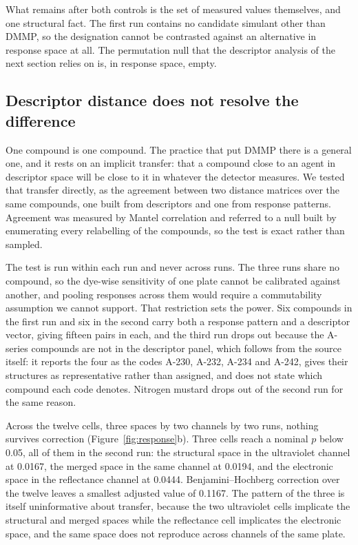 \documentclass[journal=jacsat,manuscript=article,margin=1in]{achemso}
\begin{document}
What remains after both controls is the set of measured values themselves,
and one structural fact. The first run contains no candidate simulant other
than DMMP, so the designation cannot be contrasted against an alternative
in response space at all. The permutation null that the descriptor analysis
of the next section relies on is, in response space, empty.

\subsection{Descriptor distance does not resolve the difference}
\label{res:mantel}

One compound is one compound. The practice that put DMMP there is a general
one, and it rests on an implicit transfer: that a compound close to an agent
in descriptor space will be close to it in whatever the detector measures. We
tested that transfer directly, as the agreement between two distance matrices
over the same compounds, one built from descriptors and one from response
patterns. Agreement was measured by Mantel correlation
and referred to a null built by enumerating every relabelling of the
compounds, so the test is exact rather than sampled.

The test is run within each run and never across runs. The three runs share
no compound, so the dye-wise sensitivity of one plate cannot be calibrated
against another, and pooling responses across them would require a
commutability assumption we cannot support. That restriction sets the
power. Six compounds in the first run and six in the second carry both a
response pattern and a descriptor vector, giving fifteen pairs in each,
and the third run drops out because the A-series compounds are not in the
descriptor panel, which follows from the source itself: it reports the four
as the codes A-230, A-232, A-234 and A-242, gives their structures as
representative rather than assigned, and does not state which compound each
code denotes\cite{group3ref}. Nitrogen mustard drops out of the second run for the same
reason.

Across the twelve cells, three spaces by two channels by two runs, nothing
survives correction (Figure~\ref{fig:response}b). Three cells reach a
nominal $p$ below 0.05, all of them in the second run: the structural space
in the ultraviolet channel at 0.0167, the merged space in the same channel
at 0.0194, and the electronic space in the reflectance channel at 0.0444.
Benjamini--Hochberg correction over the twelve leaves a smallest adjusted
value of 0.1167. The pattern of the three is itself uninformative about
transfer, because the two ultraviolet cells implicate the structural and
merged spaces while the reflectance cell implicates the electronic space,
and the same space does not reproduce across channels of the same plate.
\end{document}
